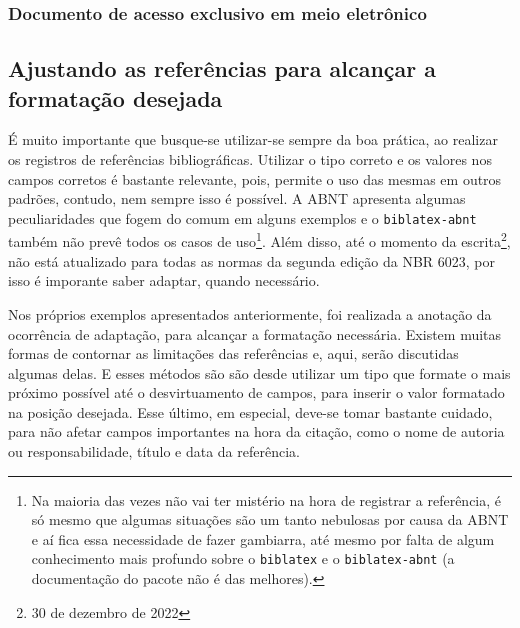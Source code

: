 

\subsubsection{Documento de acesso exclusivo em meio eletrônico}





\subsection{Ajustando as referências para alcançar a formatação desejada}
É muito importante que busque-se utilizar-se sempre da boa prática, ao realizar os registros de referências bibliográficas. Utilizar o tipo correto e os valores nos campos corretos é bastante relevante, pois, permite o uso das mesmas em outros padrões, contudo, nem sempre isso é possível. A ABNT apresenta algumas peculiaridades que fogem do comum em alguns exemplos e o \texttt{biblatex-abnt} também não prevê todos os casos de uso\footnote{Na maioria das vezes não vai ter mistério na hora de registrar a referência, é só mesmo que algumas situações são um tanto nebulosas por causa da ABNT e aí fica essa necessidade de fazer gambiarra, até mesmo por falta de algum conhecimento mais profundo sobre o \texttt{biblatex} e o \texttt{biblatex-abnt} (a documentação do pacote não é das melhores).}. Além disso, até o momento da escrita\footnote{30 de dezembro de 2022}, não está atualizado para todas as normas da segunda edição da NBR 6023, por isso é imporante saber adaptar, quando necessário. 

Nos próprios exemplos apresentados anteriormente, foi realizada a anotação da ocorrência de adaptação, para alcançar a formatação necessária. Existem muitas formas de contornar as limitações das referências e, aqui, serão discutidas algumas delas. E esses métodos são são desde utilizar um tipo que formate o mais próximo possível até o desvirtuamento de campos, para inserir o valor formatado na posição desejada. Esse último, em especial, deve-se tomar bastante cuidado, para não afetar campos importantes na hora da citação, como o nome de autoria ou responsabilidade, título e data da referência.

